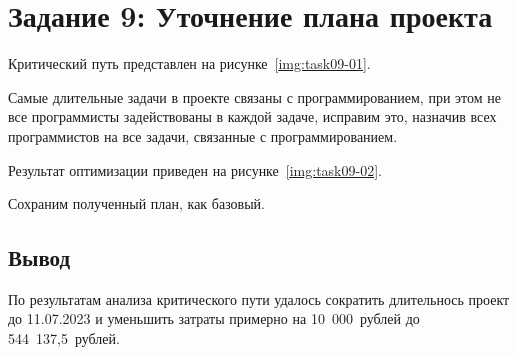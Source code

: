 \section{Задание 9: Уточнение плана проекта}

Критический путь представлен на рисунке~\ref{img:task09-01}.


Самые длительные задачи в проекте связаны с программированием, при этом не все
программисты задействованы в каждой задаче, исправим это, назначив всех
программистов на все задачи, связанные с программированием.

Результат оптимизации приведен на рисунке~\ref{img:task09-02}.


Сохраним полученный план, как базовый.

\subsection*{Вывод}

По результатам анализа критического пути удалось сократить длительнось проект до
11.07.2023 и уменьшить затраты примерно на 10~000~рублей до 544~137,5~рублей.
